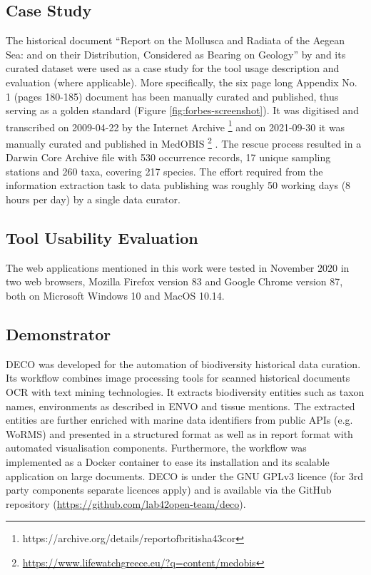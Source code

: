     \subsection{Case Study}
The historical document “Report on the Mollusca and Radiata of the Aegean Sea:
and on their Distribution, Considered as Bearing on Geology” by
\citep{WoRMS:SourceID:40714} and its curated dataset were used as a case study
for the tool usage description and evaluation (where applicable). More
specifically, the six page long Appendix No. 1 (pages 180-185) document has
been manually curated and published, thus serving as a golden standard
(Figure \ref{fig:forbes-screenshot}). It was digitised and transcribed on
2009-04-22 by the Internet Archive \footnote{https://archive.org/details/reportofbritisha43cor}
and on 2021-09-30 it was manually curated \citep{mavraki_digitization_2021} and
published in MedOBIS \footnote{\url{ https://www.lifewatchgreece.eu/?q=content/medobis}}
\citep{arvanitidis_medobis_2006}. The rescue process resulted in a Darwin Core
Archive file with 530 occurrence records, 17 unique sampling stations and
260 taxa, covering 217 species. The effort required from the information
extraction task to data publishing was roughly 50 working days (8 hours per day)
by a single data curator.

    \subsection{Tool Usability Evaluation}
The web applications mentioned in this work were tested in November 2020 in 
two web browsers, Mozilla Firefox version 83 and Google Chrome version 87,
both on Microsoft Windows 10 and MacOS 10.14.

    \subsection{Demonstrator}

DECO was developed for the automation of biodiversity historical data
curation. Its workflow combines image processing tools for scanned historical
documents OCR with text mining technologies. It extracts biodiversity entities
such as taxon names, environments as described in ENVO and tissue mentions.
The extracted entities are further enriched with marine data identifiers from
public APIs (e.g. WoRMS) and presented in a structured format as well as in
report format with automated visualisation components. Furthermore, the
workflow was implemented as a Docker container to ease its installation and its
scalable application on large documents. DECO is under the GNU GPLv3 licence
(for 3rd party components separate licences apply) and is available via the
GitHub repository (\url{https://github.com/lab42open-team/deco}).


